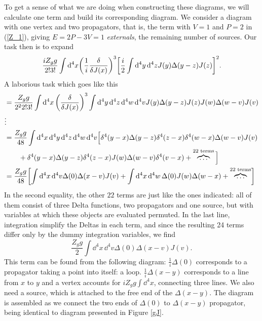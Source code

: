 To get a sense of what we are doing when constructing these diagrams, we will calculate one term and build its corresponding diagram. We consider a diagram with one vertex and two propagators, that is, the term with $V=1$ and $P=2$ in (\ref{Z_1}), giving $E=2P-3V=1$ \textit{externals}, the remaining number of sources. Our task then is to expand 
\begin{equation}
    \frac{iZ_g g}{2!3!}\int\dd^4x\qty(\frac{1}{i}\fdv{J(x)})^3\qty[\frac{i}{2}\int\dd^4y\,\dd^4zJ(y)\Delta(y-z)J(z)]^2.
    \label{expanding_term}
\end{equation}
A laborious task which goes like this
\begin{equation}
    \begin{aligned}
          & = \frac{Z_g g}{2^22!3!}\int\dd^4x\, \qty(\fdv{J(x)})^3\int\dd^4y\,\dd^4z\,\dd^4w\,\dd^4 v J(y)\Delta(y-z)J(z)J(w)\Delta(w-v)J(v)\\
         &\vdots\\ &=\frac{Z_gg}{48}\int\dd^4x\,\dd^4y\,\dd^4z\,\dd^4w\,\dd^4v \Big[\delta^4(y-x)\Delta(y-z)\delta^4(z-x)\delta^4(w-x)\Delta(w-v)J(v)\\
         &\qquad+\delta^4(y-x)\Delta(y-z)\delta^4(z-x)J(w)\Delta(w-v)\delta^4(v-x)+\overbrace{\dots}^{\text{22 terms}}\Big]\\
         &=\frac{Z_gg}{48} \qty[\int\dd^4x\,\dd^4v\Delta(0)\Delta(x-v)J(v)+\int\dd^4x\,\dd^4w\,\Delta(0)J(w)\Delta(w-x)+\overbrace{\dots}^{\text{22 terms}}]
    \end{aligned}
\end{equation}
In the second equality, the other $22$ terms are  just like the ones indicated: all of them consist of three Delta functions, two propagators and one source, but with variables at which these objects are evaluated permuted. In the last line, integration simplify the Deltas in each term, and since the resulting 24 terms differ only by the dummy integration variables, we find
\begin{equation}
    \frac{Z_gg}{2} \int\dd^4x\,\dd^4v\Delta(0)\Delta(x-v)J(v)
    \label{gJ_phi3}.
\end{equation}
This term can be found from the following diagram: $\frac{1}{i}\Delta(0)$ corresponds to a propagator taking a point into itself: a loop. $\frac{1}{i}\Delta(x-y)$ corresponds to a line from $x$ to $y$ and a vertex accounts for $iZ_gg\int\dd^4x$, connecting three lines. We also need a source, which is attached to the free end of the $\Delta(x-y)$. The diagram is assembled as we connect the two ends of $\Delta(0)$ to $\Delta(x-y)$ propagator, being identical to diagram presented in Figure \ref{gJ}.\\


